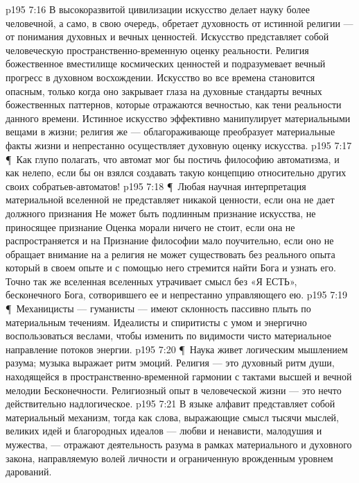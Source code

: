 \vs p195 7:16 В высокоразвитой цивилизации искусство делает науку более человечной, а само, в свою очередь, обретает духовность от истинной религии --- от понимания духовных и вечных ценностей. Искусство представляет собой человеческую пространственно\hyp{}временную оценку реальности. Религия  божественное вместилище космических ценностей и подразумевает вечный прогресс в духовном восхождении. Искусство во все времена становится опасным, только когда оно закрывает глаза на духовные стандарты вечных божественных паттернов, которые отражаются вечностью, как тени реальности данного времени. Истинное искусство эффективно манипулирует материальными вещами в жизни; религия же --- облагораживающе преобразует материальные факты жизни и непрестанно осуществляет духовную оценку искусства.
\vs p195 7:17 \P\ Как глупо полагать, что автомат мог бы постичь философию автоматизма, и как нелепо, если бы он взялся создавать такую концепцию относительно других своих собратьев\hyp{}автоматов!
\vs p195 7:18 \P\ Любая научная интерпретация материальной вселенной не представляет никакой ценности, если она не дает должного признания  Не может быть подлинным признание искусства, не приносящее признание  Оценка морали ничего не стоит, если она не распространяется и на  Признание философии мало поучительно, если оно не обращает внимание на  а религия не может существовать без реального опыта  который в своем опыте и с помощью него стремится найти Бога и узнать его. Точно так же вселенная вселенных утрачивает смысл без «Я ЕСТЬ», бесконечного Бога, сотворившего ее и непрестанно управляющего ею.
\vs p195 7:19 \P\ Механицисты --- гуманисты --- имеют склонность пассивно плыть по материальным течениям. Идеалисты и спиритисты  с умом и энергично воспользоваться веслами, чтобы изменить по видимости чисто материальное направление потоков энергии.
\vs p195 7:20 \P\ Наука живет логическим мышлением разума; музыка выражает ритм эмоций. Религия --- это духовный ритм души, находящейся в пространственно\hyp{}временной гармонии с тактами высшей и вечной мелодии Бесконечности. Религиозный опыт в человеческой жизни --- это нечто действительно надлогическое.
\vs p195 7:21 В языке алфавит представляет собой материальный механизм, тогда как слова, выражающие смысл тысячи мыслей, великих идей и благородных идеалов --- любви и ненависти, малодушия и мужества, --- отражают деятельность разума в рамках материального и духовного закона, направляемую волей личности и ограниченную врожденным уровнем дарований.
